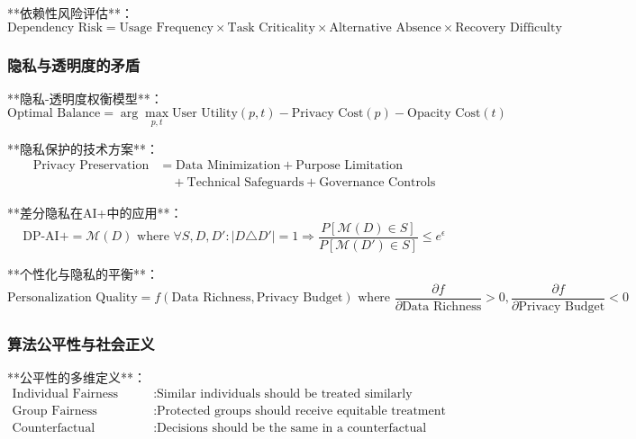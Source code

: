 **依赖性风险评估**：
\begin{equation}
\text{Dependency Risk} = \text{Usage Frequency} \times \text{Task Criticality} \times \text{Alternative Absence} \times \text{Recovery Difficulty}
\end{equation}

\subsubsection{隐私与透明度的矛盾} %

**隐私-透明度权衡模型**：
\begin{equation}
\text{Optimal Balance} = \arg\max_{p,t} \text{User Utility}(p,t) - \text{Privacy Cost}(p) - \text{Opacity Cost}(t)
\end{equation}

**隐私保护的技术方案**：
\begin{align}
\text{Privacy Preservation} &= \text{Data Minimization} + \text{Purpose Limitation} \\
&\quad + \text{Technical Safeguards} + \text{Governance Controls}
\end{align}

**差分隐私在AI+中的应用**：
\begin{equation}
\text{DP-AI+} = \mathcal{M}(D) \text{ where } \forall S, D, D': |D \triangle D'| = 1 \Rightarrow \frac{P[\mathcal{M}(D) \in S]}{P[\mathcal{M}(D') \in S]} \leq e^\epsilon
\end{equation}

**个性化与隐私的平衡**：
\begin{equation}
\text{Personalization Quality} = f(\text{Data Richness}, \text{Privacy Budget}) \text{ where } \frac{\partial f}{\partial \text{Data Richness}} > 0, \frac{\partial f}{\partial \text{Privacy Budget}} < 0
\end{equation}

\subsubsection{算法公平性与社会正义} %

**公平性的多维定义**：
\begin{align}
\text{Individual Fairness} &: \text{Similar individuals should be treated similarly} \\
\text{Group Fairness} &: \text{Protected groups should receive equitable treatment} \\
\text{Counterfactual Fairness} &: \text{Decisions should be the same in a counterfactual world}
\end{align}

